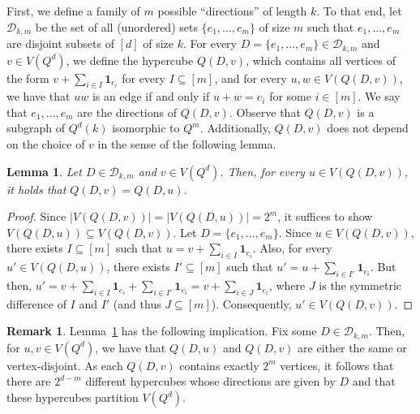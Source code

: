 \documentclass{article}
\newtheorem{lemma}[thm]{Lemma}
\theoremstyle{definition}
\newtheorem{remark}[thm]{Remark}
\newcommand{\lyuc}[1]{{\color{blue}{ [~Lyuben:\ }\emph{#1}\textbf{~]}}}
\newcommand{\cD}{\mathcal{D}}
\begin{document}
First, we define a family of $m$ possible ``directions'' of length $k$. To that end, let $\cD_{k,m}$ be the set of all (unordered) sets $\{e_1,\ldots,e_m\}$ of size $m$ such that $e_1,\ldots,e_m$ are disjoint subsets of $[d]$ of size $k$. 
For every $D=\{e_1,\ldots, e_m\}\in \cD_{k,m}$ and $v\in V(Q^d)$, we define the hypercube $Q(D,v)$, which contains all vertices of the form $v+\sum_{i\in I}\mathbf{1}_{e_i}$ for every $I\subseteq [m]$, and for every $u,w\in V(Q(D,v))$, we have that $uw$ is an edge if and only if $u+w=e_i$ for some $i\in [m]$. We say that $e_1,\ldots,e_m$ are the directions of $Q(D,v)$. Observe that $Q(D,v)$ is a subgraph of $Q^d(k)$ isomorphic to $Q^m$. Additionally, $Q(D,v)$ does not depend on the choice of $v$ in the sense of the following lemma.
 \begin{lemma}\label{lem: choice of v}
     Let $D\in \cD_{k,m}$ and $v\in V(Q^d)$. Then, for every $u\in V(Q(D,v))$, it holds that $Q(D,v)=Q(D,u)$.
 \end{lemma}
 \begin{proof}
     Since $|V(Q(D,v))|=|V(Q(D,u))|=2^m$, it suffices to show $V(Q(D,u))\subseteq V(Q(D,v))$. Let $D=\{e_1,\ldots,e_m\}$. Since $u\in V(Q(D,v))$, there exists $I\subseteq [m]$ such that $u=v+\sum_{i\in I} \mathbf{1}_{e_i}$. Also, for every $u'\in V(Q(D,u))$, there exists $I'\subseteq [m]$ such that $u'= u+\sum_{i\in I'} \mathbf{1}_{e_i}$. But then, $u' = v+\sum_{i\in I} \mathbf{1}_{e_i} + \sum_{i\in I'} \mathbf{1}_{e_i} = v+\sum_{i\in J} \mathbf{1}_{e_i}$, where $J$ is the symmetric difference of $I$ and $I'$ (and thus $J\subseteq [m]$). Consequently, $u'\in V(Q(D,v))$.
 \end{proof}
 \begin{remark}\label{rem: partition}
 Lemma~\ref{lem: choice of v} has the following implication. Fix some $D\in\cD_{k,m}$. Then, for $u,v\in V(Q^d)$, we have that $Q(D,u)$ and $Q(D,v)$ are either the same or vertex-disjoint. As each $Q(D,v)$ contains exactly $2^m$ vertices, it follows that there are $2^{d-m}$ different hypercubes whose directions are given by $D$ and that these hypercubes partition $V(Q^d)$. 
 \end{remark}
 
\end{document}
